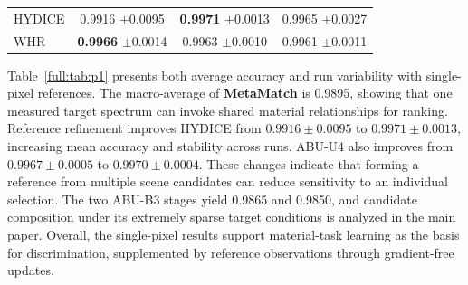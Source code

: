 \documentclass[a4paper,11pt]{article}
\newcommand{\matcher}{\textbf{MetaMatch}}
\begin{document}
\begin{table}[H]
\begin{lrbox}{\fulltablebox}
\begin{tabular}{lccc}
HYDICE & \shortstack{0.9916\\$\pm$0.0095} & \shortstack{\textbf{0.9971}\\$\pm$0.0013} & \shortstack{0.9965\\$\pm$0.0027} \\
WHR & \shortstack{\textbf{0.9966}\\$\pm$0.0014} & \shortstack{0.9963\\$\pm$0.0010} & \shortstack{0.9961\\$\pm$0.0011} \\
\bottomrule\end{tabular}\end{lrbox}\ifdim\wd\fulltablebox>\linewidth\resizebox{\linewidth}{!}{\usebox{\fulltablebox}}\else\usebox{\fulltablebox}\fi\end{table}

Table~\ref{full:tab:p1} presents both average accuracy and run variability with single-pixel references. The macro-average of \matcher{} is 0.9895, showing that one measured target spectrum can invoke shared material relationships for ranking. Reference refinement improves HYDICE from $0.9916\pm0.0095$ to $0.9971\pm0.0013$, increasing mean accuracy and stability across runs. ABU-U4 also improves from $0.9967\pm0.0005$ to $0.9970\pm0.0004$. These changes indicate that forming a reference from multiple scene candidates can reduce sensitivity to an individual selection. The two ABU-B3 stages yield 0.9865 and 0.9850, and candidate composition under its extremely sparse target conditions is analyzed in the main paper. Overall, the single-pixel results support material-task learning as the basis for discrimination, supplemented by reference observations through gradient-free updates.
\end{document}
